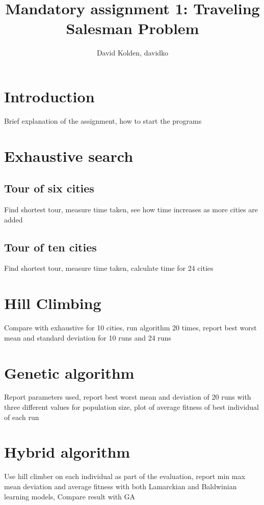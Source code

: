 \documentclass{article}
\author{David Kolden, davidko}
\title{Mandatory assignment 1: Traveling Salesman Problem}
\begin{document}
\maketitle
\tableofcontents
\section{Introduction}
Brief explanation of the assignment, how to start the programs
\section{Exhaustive search}
\subsection{Tour of six cities}
Find shortest tour, measure time taken, see how time increases as more cities are added
\subsection{Tour of ten cities}
Find shortest tour, measure time taken, calculate time for 24 cities
\section{Hill Climbing}
Compare with exhaustive for 10 cities, run algorithm 20 times, report best worst mean and standard deviation for 10 runs and 24 runs
\section{Genetic algorithm}
Report parameters used, report best worst mean and deviation of 20 runs with three different values for population size, plot of average fitness of best individual of each run
\section{Hybrid algorithm}
Use hill climber on each individual as part of the evaluation, report min max mean deviation and average fitness with both Lamarckian and Baldwinian learning models, Compare result with GA
\end{document}
